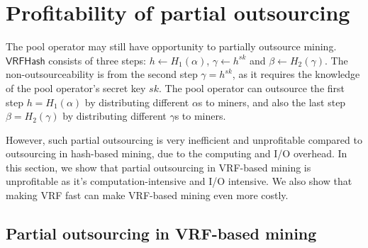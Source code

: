 \section{Profitability of partial outsourcing}
\label{sec:partial-outsourcing}

The pool operator may still have opportunity to partially outsource mining.
$\mathsf{VRFHash}$ consists of three steps: $h \gets H_1(\alpha)$, $\gamma \gets h^{sk}$ and $\beta \gets H_2(\gamma)$.
The non-outsourceability is from the second step $\gamma = h^{sk}$, as it requires the knowledge of the pool operator's secret key $sk$.
The pool operator can outsource the first step $h = H_1(\alpha)$ by distributing different $\alpha$s to miners, and also the last step $\beta = H_2(\gamma)$ by distributing different $\gamma$s to miners.

However, such partial outsourcing is very inefficient and unprofitable compared to outsourcing in hash-based mining, due to the computing and I/O overhead.
In this section, we show that partial outsourcing in VRF-based mining is unprofitable as it's computation-intensive and I/O intensive.
We also show that making VRF fast can make VRF-based mining even more costly.

\subsection{Partial outsourcing in VRF-based mining}


        




